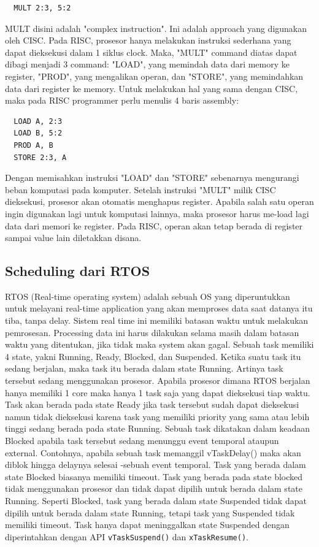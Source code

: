 \documentclass[a4paper,12pt]{article}
\begin{document}
\begin{verbatim}
  MULT 2:3, 5:2
\end{verbatim}

MULT disini adalah "complex instruction". Ini adalah approach yang digunakan oleh CISC. Pada RISC, prosesor hanya melakukan instruksi sederhana yang dapat dieksekusi dalam 1 siklus clock. Maka, "MULT" command diatas dapat dibagi menjadi 3 command: "LOAD", yang memindah data dari memory ke register, "PROD", yang mengalikan operan, dan "STORE", yang memindahkan data dari register ke memory. Untuk melakukan hal yang sama dengan CISC, maka pada RISC programmer perlu menulis 4 baris assembly:

\begin{verbatim}
  LOAD A, 2:3
  LOAD B, 5:2
  PROD A, B
  STORE 2:3, A
\end{verbatim}

Dengan memisahkan instruksi "LOAD" dan "STORE" sebenarnya mengurangi beban komputasi pada komputer. Setelah instruksi "MULT" milik CISC dieksekusi, prosesor akan otomatis menghapus register. Apabila salah satu operan ingin digunakan lagi untuk komputasi lainnya, maka prosesor harus me-load lagi data dari memori ke register. Pada RISC, operan akan tetap berada di register sampai value lain diletakkan disana.

\subsection{Scheduling dari RTOS}
RTOS (Real-time operating system) adalah sebuah OS yang diperuntukkan untuk melayani real-time application yang akan memproses data saat datanya itu tiba, tanpa delay. Sistem real time ini memiliki batasan waktu untuk melakukan pemrosesan. Processing data ini harus dilakukan selama masih dalam batasan waktu yang ditentukan, jika tidak maka system akan gagal. Sebuah task memiliki 4 state, yakni Running, Ready, Blocked, dan Suspended. Ketika suatu task itu sedang berjalan, maka task itu berada dalam state Running. Artinya task tersebut sedang menggunakan prosesor. Apabila prosesor dimana RTOS berjalan hanya memiliki 1 core maka hanya 1 task saja yang dapat dieksekusi tiap waktu. Task akan berada pada state Ready jika task tersebut sudah dapat dieksekusi namun tidak dieksekusi karena task yang memiliki priority yang sama atau lebih tinggi sedang berada pada state Running. Sebuah task dikatakan dalam keadaan Blocked apabila task tersebut sedang menunggu event temporal ataupun external. Contohnya, apabila sebuah task memanggil vTaskDelay() maka akan diblok hingga delaynya selesai -sebuah event temporal. Task yang berada dalam state Blocked biasanya memiliki timeout. Task yang berada pada state blocked tidak menggunakan prosesor dan tidak dapat dipilih untuk berada dalam state Running. Seperti Blocked, task yang berada dalam state Suspended tidak dapat dipilih untuk berada dalam state Running, tetapi task yang Suspended tidak memiliki timeout. Task hanya dapat meninggalkan state Suspended dengan diperintahkan dengan API \verb|vTaskSuspend()| dan \verb|xTaskResume()|.
\end{document}
